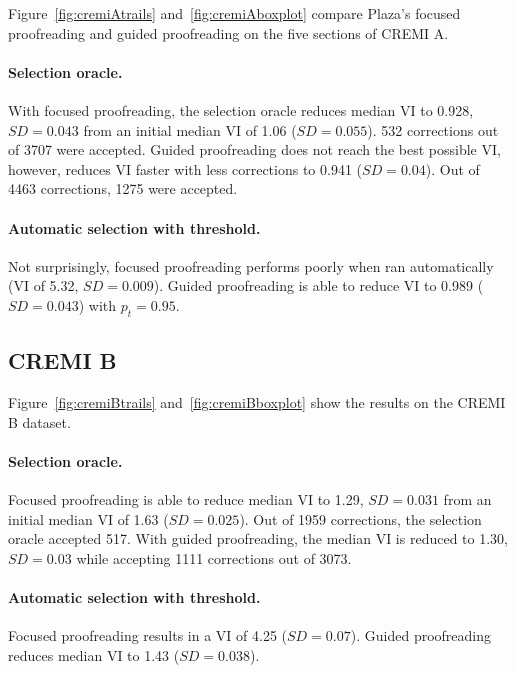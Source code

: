 Figure~\ref{fig:cremiAtrails} and~\ref{fig:cremiAboxplot} compare Plaza's focused proofreading and guided proofreading on the five sections of CREMI A.

\vspace{-4mm}

\paragraph{Selection oracle.} With focused proofreading, the selection oracle reduces median VI to 0.928, $SD=0.043$ from an initial median VI of 1.06 ($SD=0.055$). 532 corrections out of 3707 were accepted. Guided proofreading does not reach the best possible VI, however, reduces VI faster with less corrections to 0.941 ($SD=0.04$). Out of 4463 corrections, 1275 were accepted.

\paragraph{Automatic selection with threshold.} Not surprisingly, focused proofreading performs poorly when ran automatically (VI of 5.32, $SD=0.009$). Guided proofreading is able to reduce VI to 0.989 ($SD=0.043$) with $p_t=0.95$.

\subsection{CREMI B}

Figure~\ref{fig:cremiBtrails} and~\ref{fig:cremiBboxplot} show the results on the CREMI B dataset.

\paragraph{Selection oracle.} Focused proofreading is able to reduce median VI to 1.29, $SD=0.031$ from an initial median VI of 1.63 ($SD=0.025$). Out of 1959 corrections, the selection oracle accepted 517. With guided proofreading, the median VI is reduced to 1.30, $SD=0.03$ while accepting 1111 corrections out of 3073.

\paragraph{Automatic selection with threshold.} Focused proofreading results in a VI of 4.25 ($SD=0.07$). Guided proofreading reduces median VI to 1.43 ($SD=0.038$).

